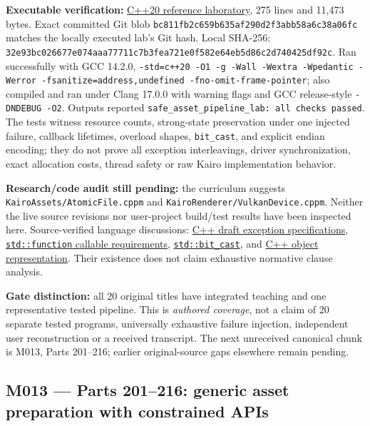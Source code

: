\textbf{Executable verification:} \hyperref[source-file-32e93bc026677e074aaa7771]{C++20 reference laboratory}, 275 lines and 11,473 bytes. Exact committed Git blob \texttt{bc811fb2c659b635af290d2f3abb58a6c38a06fc} matches the locally executed lab's Git hash. Local SHA-256: \texttt{32e93bc026677e074aaa77711c7b3fea721e0f582e64eb5d86c2d740425df92c}. Ran successfully with GCC 14.2.0, \texttt{-std=c++20\ -O1\ -g\ -Wall\ -Wextra\ -Wpedantic\ -Werror\ -fsanitize=address,undefined\ -fno-omit-frame-pointer}; also compiled and ran under Clang 17.0.0 with warning flags and GCC release-style \texttt{-DNDEBUG\ -O2}. Outputs reported \texttt{safe\_asset\_pipeline\_lab:\ all\ checks\ passed}. The tests witness resource counts, strong-state preservation under one injected failure, callback lifetimes, overload shapes, \texttt{bit\_cast}, and explicit endian encoding; they do not prove all exception interleavings, driver synchronization, exact allocation costs, thread safety or raw Kairo implementation behavior.

\textbf{Research/code audit still pending:} the curriculum suggests \texttt{KairoAssets/AtomicFile.cppm} and \texttt{KairoRenderer/VulkanDevice.cppm}. Neither the live source revisions nor user-project build/test results have been inspected here. Source-verified language discussions: \href{https://eel.is/c++draft/except.spec}{C++ draft exception specifications}, \href{https://en.cppreference.com/w/cpp/utility/functional/function}{\texttt{std::function} callable requirements}, \href{https://en.cppreference.com/w/cpp/numeric/bit_cast}{\texttt{std::bit\_cast}}, and \href{https://en.cppreference.com/w/cpp/language/object}{C++ object representation}. Their existence does not claim exhaustive normative clause analysis.

\textbf{Gate distinction:} all 20 original titles have integrated teaching and one representative tested pipeline. This is \emph{authored coverage}, not a claim of 20 separate tested programs, universally exhaustive failure injection, independent user reconstruction or a received transcript. The next unreceived canonical chunk is M013, Parts 201--216; earlier original-source gaps elsewhere remain pending.

\subsection{M013 --- Parts 201--216: generic asset preparation with constrained APIs}\label{appendix-fd090d982a15-m013-parts-201216-generic-asset-preparation-with-constrained-apis}

